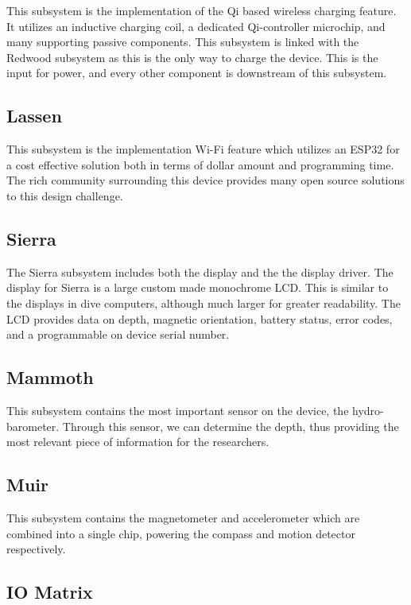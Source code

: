 \documentclass{article}
\begin{document}
This subsystem is the implementation of the Qi based wireless charging feature. It utilizes an inductive charging coil, a dedicated Qi-controller microchip, and many supporting passive components. This subsystem is linked with the Redwood subsystem as this is the only way to charge the device. This is the input for power, and every other component is downstream of this subsystem.


\subsection*{Lassen}

This subsystem is the implementation Wi-Fi feature which utilizes an ESP32 for a cost effective solution both in terms of dollar amount and programming time. The rich community surrounding this device provides many open source solutions to this design challenge. 


\subsection*{Sierra}

The Sierra subsystem includes both the display and the the display driver. The display for Sierra is a large custom made monochrome LCD. This is similar to the displays in dive computers, although much larger for greater readability. The LCD provides data on depth, magnetic orientation, battery status, error codes, and a programmable on device serial number.


\subsection*{Mammoth}

This subsystem contains the most important sensor on the device, the hydro-barometer. Through this sensor, we can determine the depth, thus providing the most relevant piece of information for the researchers.


\subsection*{Muir}

This subsystem contains the magnetometer and accelerometer which are combined into a single chip, powering the compass and motion detector respectively.

\pagebreak

\subsection{IO Matrix}
\end{document}
